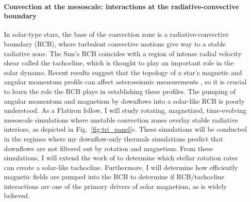 \documentclass[onecolumn, hmargin=1in, vmargin=1in]{aastex62}
\begin{document}
\paragraph{Convection at the mesoscale: interactions at the radiative-convective boundary}
In solar-type stars, the base of the convection zone is a radiative-convective boundary (RCB), where turbulent convective motions give way to a stable radiative zone.
The Sun's RCB coincides with a region of intense radial velocity shear called the tachocline, which is thought to play an important role in the solar dynamo.
Recent results suggest that the topology of a star's magnetic and angular momentum profile can affect asteroseismic measurements \citep{benomar&all2018, santos&all2018}, so it is crucial to learn the role the RCB plays in establishing these profiles.
The pumping of angular momentum and magnetism by downflows into a solar-like RCB is poorly understood.
As a Flatiron fellow, I will study rotating, magnetized, time-evolving mesoscale simulations where unstable convection zones overlay stable radiative interiors, as depicted in Fig.~\ref{fig:tri_panel}c.
These simulations will be conducted in the regimes where my downflow-only thermals simulations predict that downflows are not filtered out by rotation and magnetism.
From these simulations, I will extend the work of \citet{wood&brummell2018} to determine which stellar rotation rates can create a solar-like tachocline.
Furthermore, I will determine how efficiently magnetic fields are pumped into the RCB to determine if RCB/tachocline interactions are one of the primary drivers of solar magnetism, as is widely believed.
\end{document}
